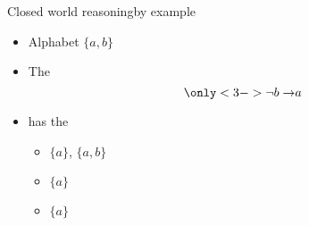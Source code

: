 \begin{frame}{Closed world reasoning}{by example}
  \bigskip
  \begin{itemize}
  \item Alphabet $\{a,b\}$
    \medskip
  \item<2-> The 
    \[
      \only<3->{\neg b\to} a
    \]
  \item[] has the
    \par\smallskip
    \begin{itemize}\normalsize
    \item {}         $\{a\}$, $\{a,b\}$
      \smallskip
    \item {} $\{a\}$
      \smallskip
    \item {}  $\{a\}$
    \end{itemize}
  \end{itemize}
\end{frame}
%
